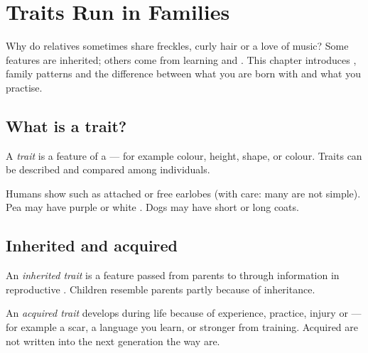 \chapter{Traits Run in Families}\label{ch:g4:traits}

Why do relatives sometimes share freckles, curly hair or a love of
music? Some features are inherited; others come from learning and
. This chapter introduces , family patterns and the
difference between what you are born with and what you practise.

\section{What is a trait?}

\begin{definition}[Trait]\label{def:g4:traits:trait}
A \emph{trait} is a feature of a  --- for
example  colour, height,  shape, or  colour. Traits can be
described and compared among individuals.
\end{definition}

\begin{example}\label{ex:g4:traits:examples}
Humans show  such as attached or free earlobes (with care: many
 are not simple). Pea  may have purple or white .
Dogs may have short or long coats.
\end{example}

\section{Inherited and acquired}

\begin{definition}\label{def:g4:traits:inherited}
An \emph{inherited trait} is a feature passed
from parents to  through information in reproductive .
Children resemble parents partly because of inheritance.
\end{definition}

\begin{definition}\label{def:g4:traits:acquired}
An \emph{acquired trait} develops during life
because of experience, practice, injury or  --- for example
a scar, a language you learn, or stronger  from training.
Acquired  are not written into the next generation the way
 are.
\end{definition}

